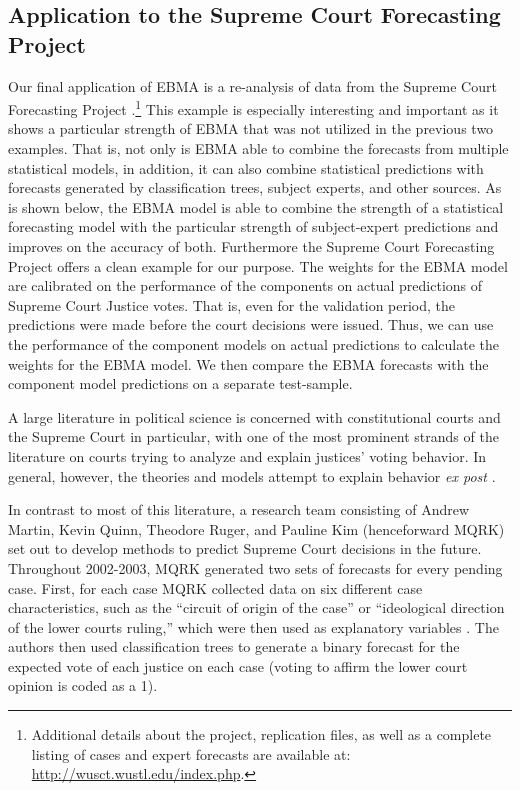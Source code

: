 \documentclass[12pt,fullpage,endnotes]{article}
\newcommand{\note}[1]{\footnote{ #1 \vspace{4 mm}}}
\begin{document}
\subsection{Application to the Supreme Court Forecasting Project}
Our final application of EBMA is a re-analysis of data from the
Supreme Court Forecasting Project
\citep{Ruger:2004,Martin:2004}.\note{Additional details about the
  project, replication files, as well as a complete listing of cases
  and expert forecasts are available at:
  \url{http://wusct.wustl.edu/index.php}.} This example is especially
interesting and important as it shows a particular strength of EBMA
that was not utilized in the previous two examples. That is, not only
is EBMA able to combine the forecasts from multiple statistical
models, in addition, it can also combine statistical predictions with
forecasts generated by classification trees, subject experts, and
other sources. As is shown below, the EBMA model is able to combine
the strength of a statistical forecasting model with the particular
strength of subject-expert predictions and improves on the accuracy of
both. Furthermore the Supreme Court Forecasting Project offers a clean
example for our purpose. The weights for the EBMA model are calibrated
on the performance of the components on actual predictions of Supreme
Court Justice votes. That is, even for the validation period, the
predictions were made before the court decisions were issued.  Thus,
we can use the performance of the component models on actual
predictions to calculate the weights for the EBMA model.  We then
compare the EBMA forecasts with the component model predictions on a
separate test-sample.

A large literature in political science is concerned with
constitutional courts and the Supreme Court in particular, with one of
the most prominent strands of the literature on courts trying to
analyze and explain justices' voting behavior. In general, however,
the theories and models attempt to explain behavior \textit{ex post}
\citep[e.g.,][]{Hausegger_Baum_1999, Segal_Cover_1989,
  Richards_Kritzer_2002, Klein_Hume_2003, Songer_etal_1994}.

In contrast to most of this literature, a research team consisting of
Andrew Martin, Kevin Quinn, Theodore Ruger, and Pauline Kim
(henceforward MQRK) set out to develop methods to predict Supreme
Court decisions in the future.  Throughout 2002-2003, MQRK generated
two sets of forecasts for every pending case. First, for each case
MQRK collected data on six different case characteristics, such as the
``circuit of origin of the case'' or ``ideological direction of the
lower courts ruling,'' which were then used as explanatory variables
\cite[762]{Martin:2004}. The authors then used classification trees to
generate a binary forecast for the expected vote of each justice on
each case (voting to affirm the lower court opinion is coded as a
1). 
\end{document}
